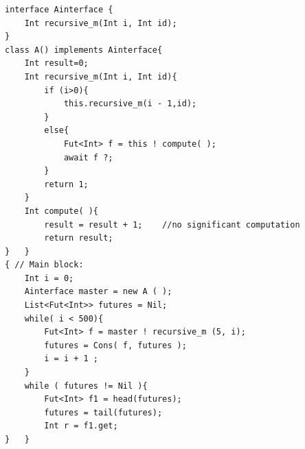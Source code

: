 \begin{lstlisting}[caption= Benchmark Example, label=absex]
interface Ainterface {
	Int recursive_m(Int i, Int id);
}
class A() implements Ainterface{
	Int result=0;
	Int recursive_m(Int i, Int id){
		if (i>0){
			this.recursive_m(i - 1,id);	
		}
		else{
			Fut<Int> f = this ! compute( );
			await f ?;
		}
		return 1;
	}
	Int compute( ){
		result = result + 1;	//no significant computation
		return result;
}	}
{ // Main block:
	Int i = 0;	
	Ainterface master = new A ( );
	List<Fut<Int>> futures = Nil;	
	while( i < 500){		
		Fut<Int> f = master ! recursive_m (5, i);
		futures = Cons( f, futures );
		i = i + 1 ;
	}
	while ( futures != Nil ){
		Fut<Int> f1 = head(futures);
		futures = tail(futures);
		Int r = f1.get;
}	}
\end{lstlisting}
%
%
%	
